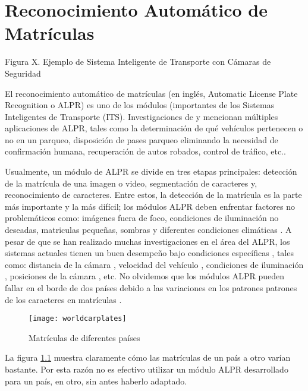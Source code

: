 \chapter{Reconocimiento Automático de Matrículas}
Figura X. Ejemplo de Sistema Inteligente de Transporte con Cámaras de Seguridad \parencite{TechFAQ2016-oi}

El reconocimiento automático de matrículas (en inglés, Automatic License Plate Recognition o ALPR) es uno de los módulos (importantes de los Sistemas Inteligentes de Transporte (ITS). Investigaciones de \parencite{Anagnostopoulos2008-uh} y \parencite{TechTarget2016-gw} mencionan múltiples aplicaciones de ALPR, tales como la determinación de qué vehículos pertenecen o no en un parqueo, disposición de pases parqueo eliminando la necesidad de confirmación humana, recuperación de autos robados, control de tráfico, etc..

Usualmente, un módulo de ALPR se divide en tres etapas principales: detección de la matrícula de una imagen o video, segmentación de caracteres y, reconocimiento de caracteres. Entre estos, la detección de la matrícula es la parte más importante y la más difícil; los módulos ALPR deben enfrentar factores no problemáticos como: imágenes fuera de foco, condiciones de iluminación no deseadas, matriculas pequeñas, sombras y diferentes condiciones climáticas \parencite{Mahini2006-us}.
A pesar de que se han realizado muchas investigaciones en el área del ALPR, los sistemas actuales tienen un buen desempeño bajo condiciones específicas \parencite{Anagnostopoulos2006-is}, tales como: distancia de la cámara \parencite{Martin2002-zu,Guo2008-qk}, velocidad del vehículo \parencite{Garibotto2001-lu}, condiciones de iluminación \parencite{Xiong2004-qv,Mahini2006-us}, posiciones de la cámara \parencite{Chang2004-kg}, etc. No olvidemos que los módulos ALPR pueden fallar en el borde de dos países debido a las variaciones en los patrones patrones de los caracteres en matrículas \parencite{Anagnostopoulos2006-is,Shapiro2006-rv,Mecocci2006-nt}.

  \begin{figure}[H]
        \centering
        \texttt{[image: worldcarplates]}
        \caption{ Matrículas de diferentes países \parencite{Kustermann2016-yd}}
        \label{fig:worldcarplates}
\end{figure}  

La figura \ref{fig:worldcarplates} muestra claramente cómo las matrículas de un país a otro varían bastante. Por esta razón no es efectivo utilizar un módulo ALPR desarrollado para un país, en otro, sin antes haberlo adaptado.
